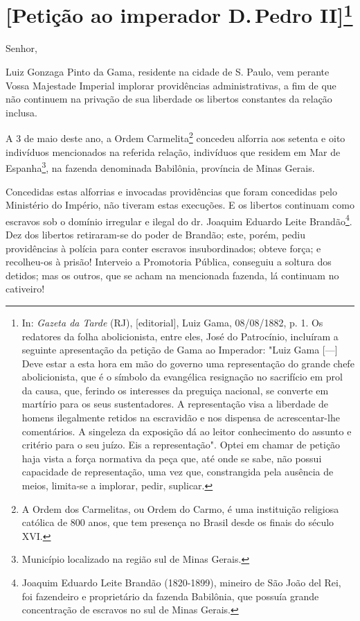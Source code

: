 {\chapter{{[}Petição ao imperador D.\,Pedro II{]}\footnote[*]{In:
  \emph{Gazeta da Tarde} (RJ), {[}editorial{]}, Luiz Gama, 08/08/1882,
  p. 1. Os redatores da folha abolicionista, entre eles, José do
  Patrocínio, incluíram a seguinte apresentação da petição de Gama ao
  Imperador: "Luiz Gama {[}---{]} Deve estar a esta hora em mão do
  governo uma representação do grande chefe abolicionista, que é o
  símbolo da evangélica resignação no sacrifício em prol da causa, que,
  ferindo os interesses da preguiça nacional, se converte em martírio
  para os seus sustentadores.
  A representação visa a liberdade de homens ilegalmente retidos na
  escravidão e nos dispensa de acrescentar-lhe comentários.
  A singeleza da exposição dá ao leitor conhecimento do assunto e
  critério para o seu juízo.
  Eis a representação". Optei em chamar de petição haja vista a força
  normativa da peça que, até onde se sabe, não possui capacidade de
  representação, uma vez que, constrangida pela ausência de meios,
  limita-se a implorar, pedir, suplicar.}}

Senhor,

Luiz Gonzaga Pinto da Gama, residente na cidade de S. Paulo, vem perante
Vossa Majestade Imperial implorar providências administrativas, a fim de
que não continuem na privação de sua liberdade os libertos constantes da
relação inclusa.

A 3 de maio deste ano, a Ordem Carmelita\footnote{A Ordem dos
  Carmelitas, ou Ordem do Carmo, é uma instituição religiosa católica de
  800 anos, que tem presença no Brasil desde os finais do século XVI.}
concedeu alforria aos setenta e oito indivíduos mencionados na referida
relação, indivíduos que residem em Mar de Espanha\footnote{Município
  localizado na região sul de Minas Gerais.}, na fazenda denominada
Babilônia, província de Minas Gerais.

Concedidas estas alforrias e invocadas providências que foram concedidas
pelo Ministério do Império, não tiveram estas execuções. E os libertos
continuam como escravos sob o domínio irregular e ilegal do dr. Joaquim
Eduardo Leite Brandão\footnote{Joaquim Eduardo Leite Brandão
  (1820-1899), mineiro de São João del Rei, foi fazendeiro e
  proprietário da fazenda Babilônia, que possuía grande concentração de
  escravos no sul de Minas Gerais.}. Dez dos libertos retiraram-se do
poder de Brandão; este, porém, pediu providências à polícia para conter
escravos insubordinados; obteve força; e recolheu-os à prisão! Interveio
a Promotoria Pública, conseguiu a soltura dos detidos; mas os outros,
que se acham na mencionada fazenda, lá continuam no cativeiro!

}
